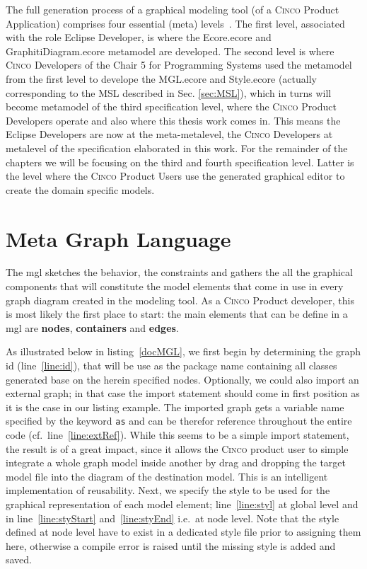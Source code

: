The full generation process of a graphical modeling tool (of a \textsc{Cinco} Product Application) comprises four essential (meta) levels~\cite{Naujokat2018}. The first level, associated with the role Eclipse Developer, is where the Ecore.ecore and GraphitiDiagram.ecore metamodel are developed. The second level is where \textsc{Cinco} Developers of the Chair 5 for Programming Systems used the metamodel from the first level to develope the MGL.ecore and Style.ecore (actually corresponding to the MSL described in Sec. \ref{sec:MSL}), which in turns will become metamodel of the third specification level, where the \textsc{Cinco} Product Developers operate and also where this thesis work comes in. This means the Eclipse Developers are now at the meta-metalevel, the \textsc{Cinco} Developers at metalevel of the specification elaborated in this work. For the remainder of the chapters we will be focusing on the third and fourth specification level. Latter is the level where the \textsc{Cinco} Product Users use the generated graphical editor to create the domain specific models. 

\section{Meta Graph Language}\label{sec:MGL}

The \acrfull{mgl} sketches the behavior, the constraints and gathers the all the graphical components that will constitute the model elements that come in use in every graph diagram created in the modeling tool. As a \textsc{Cinco} Product developer, this is most likely the first place to start: the main elements that can be define in a \acrshort{mgl} are \textbf{nodes}, \textbf{containers} and \textbf{edges}. 

As illustrated below in listing~\ref{docMGL}, we first begin by determining the graph id (line~\ref{line:id}), that will be use as the package name containing all classes generated base on the herein specified nodes. Optionally, we could also import an external graph; in that case the import statement should come in first position as it is the case in our listing example. The imported graph gets a variable name specified by the keyword \lstinline[language=MGL]{as} and can be therefor reference throughout the entire code (cf.\ line~\ref{line:extRef}). While this seems to be a simple import statement, the result is of a great impact, since it allows the \textsc{Cinco} product user to simple integrate a whole graph model inside another by drag and dropping the target model file into the diagram of the destination model. This is an intelligent implementation of reusability. Next, we specify the style to be used for the graphical representation of each model element; line~\ref{line:styl} at global level and in line~\ref{line:styStart} and~\ref{line:styEnd} i.e.\ at node level. Note that the style defined at node level have to exist in a dedicated style file prior to assigning them here, otherwise a compile error is raised until the missing style is added and saved.

